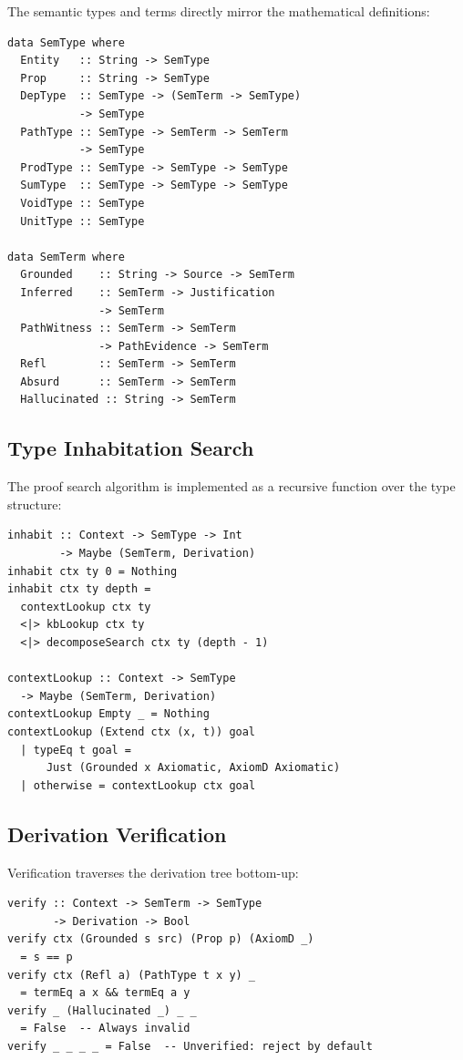 \documentclass[11pt,a4paper]{article}
\theoremstyle{plain}
\theoremstyle{definition}
\theoremstyle{remark}
\begin{document}
The semantic types and terms directly mirror the mathematical definitions:

\begin{lstlisting}[caption={Semantic types and terms}]
data SemType where
  Entity   :: String -> SemType
  Prop     :: String -> SemType
  DepType  :: SemType -> (SemTerm -> SemType)
           -> SemType
  PathType :: SemType -> SemTerm -> SemTerm
           -> SemType
  ProdType :: SemType -> SemType -> SemType
  SumType  :: SemType -> SemType -> SemType
  VoidType :: SemType
  UnitType :: SemType

data SemTerm where
  Grounded    :: String -> Source -> SemTerm
  Inferred    :: SemTerm -> Justification
              -> SemTerm
  PathWitness :: SemTerm -> SemTerm
              -> PathEvidence -> SemTerm
  Refl        :: SemTerm -> SemTerm
  Absurd      :: SemTerm -> SemTerm
  Hallucinated :: String -> SemTerm
\end{lstlisting}

\subsection{Type Inhabitation Search}

The proof search algorithm is implemented as a recursive function over the type structure:

\begin{lstlisting}[caption={Type inhabitation search}]
inhabit :: Context -> SemType -> Int
        -> Maybe (SemTerm, Derivation)
inhabit ctx ty 0 = Nothing
inhabit ctx ty depth =
  contextLookup ctx ty
  <|> kbLookup ctx ty
  <|> decomposeSearch ctx ty (depth - 1)

contextLookup :: Context -> SemType
  -> Maybe (SemTerm, Derivation)
contextLookup Empty _ = Nothing
contextLookup (Extend ctx (x, t)) goal
  | typeEq t goal =
      Just (Grounded x Axiomatic, AxiomD Axiomatic)
  | otherwise = contextLookup ctx goal
\end{lstlisting}

\subsection{Derivation Verification}

Verification traverses the derivation tree bottom-up:

\begin{lstlisting}[caption={Derivation verification}]
verify :: Context -> SemTerm -> SemType
       -> Derivation -> Bool
verify ctx (Grounded s src) (Prop p) (AxiomD _)
  = s == p
verify ctx (Refl a) (PathType t x y) _
  = termEq a x && termEq a y
verify _ (Hallucinated _) _ _
  = False  -- Always invalid
verify _ _ _ _ = False  -- Unverified: reject by default
\end{lstlisting}
\end{document}

